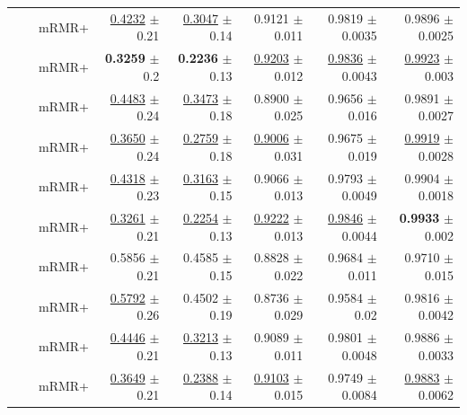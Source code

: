 \begin{longtable}{llp{}rrrrr}
 &  & mRMR+ & \underline{0.4232} {\scriptsize $\pm$ 0.21} & \underline{0.3047} {\scriptsize $\pm$ 0.14} & 0.9121 {\scriptsize $\pm$ 0.011} & 0.9819 {\scriptsize $\pm$ 0.0035} & 0.9896 {\scriptsize $\pm$ 0.0025} \\
 &  & mRMR+ & \textbf{0.3259} {\scriptsize $\pm$ 0.2} & \textbf{0.2236} {\scriptsize $\pm$ 0.13} & \underline{0.9203} {\scriptsize $\pm$ 0.012} & \underline{0.9836} {\scriptsize $\pm$ 0.0043} & \underline{0.9923} {\scriptsize $\pm$ 0.003} \\
 &  & mRMR+ & \underline{0.4483} {\scriptsize $\pm$ 0.24} & \underline{0.3473} {\scriptsize $\pm$ 0.18} & 0.8900 {\scriptsize $\pm$ 0.025} & 0.9656 {\scriptsize $\pm$ 0.016} & 0.9891 {\scriptsize $\pm$ 0.0027} \\
 &  & mRMR+ & \underline{0.3650} {\scriptsize $\pm$ 0.24} & \underline{0.2759} {\scriptsize $\pm$ 0.18} & \underline{0.9006} {\scriptsize $\pm$ 0.031} & 0.9675 {\scriptsize $\pm$ 0.019} & \underline{0.9919} {\scriptsize $\pm$ 0.0028} \\
 &  & mRMR+ & \underline{0.4318} {\scriptsize $\pm$ 0.23} & \underline{0.3163} {\scriptsize $\pm$ 0.15} & 0.9066 {\scriptsize $\pm$ 0.013} & 0.9793 {\scriptsize $\pm$ 0.0049} & 0.9904 {\scriptsize $\pm$ 0.0018} \\
 &  & mRMR+ & \underline{0.3261} {\scriptsize $\pm$ 0.21} & \underline{0.2254} {\scriptsize $\pm$ 0.13} & \underline{0.9222} {\scriptsize $\pm$ 0.013} & \underline{0.9846} {\scriptsize $\pm$ 0.0044} & \textbf{0.9933} {\scriptsize $\pm$ 0.002} \\
 &  & mRMR+ & 0.5856 {\scriptsize $\pm$ 0.21} & 0.4585 {\scriptsize $\pm$ 0.15} & 0.8828 {\scriptsize $\pm$ 0.022} & 0.9684 {\scriptsize $\pm$ 0.011} & 0.9710 {\scriptsize $\pm$ 0.015} \\
 &  & mRMR+ & \underline{0.5792} {\scriptsize $\pm$ 0.26} & 0.4502 {\scriptsize $\pm$ 0.19} & 0.8736 {\scriptsize $\pm$ 0.029} & 0.9584 {\scriptsize $\pm$ 0.02} & 0.9816 {\scriptsize $\pm$ 0.0042} \\
 &  & mRMR+ & \underline{0.4446} {\scriptsize $\pm$ 0.21} & \underline{0.3213} {\scriptsize $\pm$ 0.13} & 0.9089 {\scriptsize $\pm$ 0.011} & 0.9801 {\scriptsize $\pm$ 0.0048} & 0.9886 {\scriptsize $\pm$ 0.0033} \\
 &  & mRMR+ & \underline{0.3649} {\scriptsize $\pm$ 0.21} & \underline{0.2388} {\scriptsize $\pm$ 0.14} & \underline{0.9103} {\scriptsize $\pm$ 0.015} & 0.9749 {\scriptsize $\pm$ 0.0084} & \underline{0.9883} {\scriptsize $\pm$ 0.0062} \\

\end{longtable}
